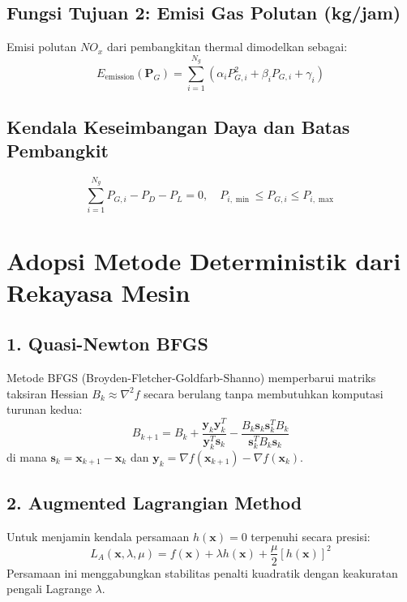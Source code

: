 \documentclass[11pt,a4paper]{article}
\begin{document}
\subsection{Fungsi Tujuan 2: Emisi Gas Polutan (kg/jam)}
Emisi polutan $NO_x$ dari pembangkitan thermal dimodelkan sebagai:
\begin{equation}
    E_{\text{emission}}(\mathbf{P}_G) = \sum_{i=1}^{N_g} \left( \alpha_i P_{G,i}^2 + \beta_i P_{G,i} + \gamma_i \right)
\end{equation}

\subsection{Kendala Keseimbangan Daya dan Batas Pembangkit}
\begin{equation}
    \sum_{i=1}^{N_g} P_{G,i} - P_D - P_L = 0, \quad P_{i,\min} \le P_{G,i} \le P_{i,\max}
\end{equation}

\section{Adopsi Metode Deterministik dari Rekayasa Mesin}

\subsection{1. Quasi-Newton BFGS}
Metode BFGS (Broyden-Fletcher-Goldfarb-Shanno) memperbarui matriks taksiran Hessian $B_k \approx \nabla^2 f$ secara berulang tanpa membutuhkan komputasi turunan kedua:
\begin{equation}
    B_{k+1} = B_k + \frac{\mathbf{y}_k \mathbf{y}_k^T}{\mathbf{y}_k^T \mathbf{s}_k} - \frac{B_k \mathbf{s}_k \mathbf{s}_k^T B_k}{\mathbf{s}_k^T B_k \mathbf{s}_k}
\end{equation}
di mana $\mathbf{s}_k = \mathbf{x}_{k+1} - \mathbf{x}_k$ dan $\mathbf{y}_k = \nabla f(\mathbf{x}_{k+1}) - \nabla f(\mathbf{x}_k)$.

\subsection{2. Augmented Lagrangian Method}
Untuk menjamin kendala persamaan $h(\mathbf{x}) = 0$ terpenuhi secara presisi:
\begin{equation}
    L_A(\mathbf{x}, \lambda, \mu) = f(\mathbf{x}) + \lambda h(\mathbf{x}) + \frac{\mu}{2} [h(\mathbf{x})]^2
\end{equation}
Persamaan ini menggabungkan stabilitas penalti kuadratik dengan keakuratan pengali Lagrange $\lambda$.
\end{document}

